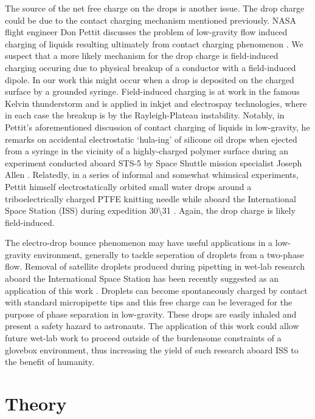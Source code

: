 \documentclass[aip,reprint, floatfix]{revtex4-1}
\begin{document}
The source of the net free charge on the drops is another issue. The drop charge could be due to the contact charging mechanism mentioned previously. NASA flight engineer Don Pettit discusses the problem of low-gravity flow induced charging of liquids resulting ultimately from contact charging phenomenon \cite{pettit_donald_flow_????}. We suspect that a more likely mechanism for the drop charge is field-induced charging occuring due to physical breakup of a conductor with a field-induced dipole. In our work this might occur when a drop is deposited on the charged surface by a grounded syringe. Field-induced charging is at work in the famous Kelvin thunderstorm and is applied in inkjet and electrospay technologies, where in each case the breakup is by the Rayleigh-Plateau instability. Notably, in Pettit's aforementioned discussion of contact charging of liquids in low-gravity, he remarks on accidental electrostatic `hula-ing' of silicone oil drops when ejected from a syringe in the vicinity of a highly-charged polymer surface during an experiment conducted aboard STS-5 by Space Shuttle mission specialist Joseph Allen \cite{pettit_donald_flow_????}. Relatedly, in a series of informal and somewhat whimsical experiments, Pettit himself electrostatically orbited small water drops around a triboelectrically charged PTFE knitting needle while aboard the International Space Station (ISS) during expedition 30\textbackslash 31 \cite{stevenson_electrostatic_2015}. Again, the drop charge is likely field-induced.

The electro-drop bounce phenomenon may have useful applications in a low-gravity environment, generally to tackle seperation of droplets from a two-phase flow. Removal of satellite droplets produced during pipetting in wet-lab research aboard the International Space Station has been recently suggested as an application of this work \cite{ungar_surface_2018}. Droplets can become spontaneously charged by contact with standard micropipette tips \citep{choi_spontaneous_2013} and this free charge can be leveraged for the purpose of phase separation in low-gravity. These drops are easily inhaled and present a safety hazard to astronauts. The application of this work could allow future wet-lab work to proceed outside of the burdensome constraints of a glovebox environment, thus increasing the yield of such research aboard ISS to the benefit of humanity.

\section{Theory}
\end{document}

